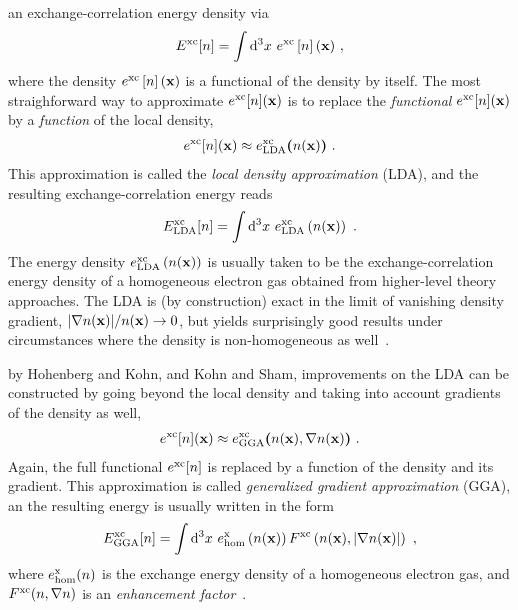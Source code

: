  an exchange-correlation energy density via
\begin{align}
	E^{\rm xc}[n] 
		= \int \d^3 x ~ e^{\rm xc} \left[ n \right] ({\bf x})~,
\label{eq:dft.xc.1}
\end{align}
where the density $e^{\rm xc} \left[ n \right] ({\bf x})$ is a functional of the density by itself. 
The most straighforward way to approximate $e^{\rm xc}[n] ({\bf x})$ is to replace the \emph{functional} $e^{\rm xc} [n] ({\bf x})$ by a \emph{function} of the local density,
\begin{align}
	e^{\rm xc} [n] ({\bf x})
		\approx e^{\rm xc}_{\rm LDA} \bm ( n({\bf x}) \bm )~.
	\label{eq:dft.exc.lda.1}
\end{align}
This approximation is called the \emph{local density approximation} (LDA), and the resulting exchange-correlation energy reads
\begin{align}
	E^{\rm xc}_{\rm LDA}[n] 
		= \int \d^3 x ~ e^{\rm xc}_{\rm LDA} \left(n ({\bf x}) \right)~.
	\label{eq:dft.LDA.1}
\end{align}
The energy density $e^{\rm xc}_{\rm LDA} \left(n ({\bf x}) \right)$ is usually taken to be the exchange-correlation energy density of a homogeneous electron gas obtained from higher-level theory approaches. The LDA is (by construction) exact in the limit of vanishing density gradient, $\lvert \nabla n ({\bf x}) \rvert / n({\bf x}) \rightarrow 0$, but yields surprisingly good results under circumstances where the density is non-homogeneous as well~\cite[p.\,183]{Dreizler2012}.

 by Hohenberg and Kohn, and Kohn and Sham, improvements on the LDA can be constructed by going beyond the local density and taking into account gradients of the density as well,
\begin{align}
	e^{\rm xc} [n] ({\bf x})
		\approx e^{\rm xc}_{\rm GGA} \bm ( n({\bf x}), \nabla n({\bf x}) \bm )~.
	\label{eq:dft.exc.gga.1}
\end{align}
Again, the full functional $e^{\rm xc}[n]$ is replaced by a function of the density and its gradient. This approximation is called \emph{generalized gradient approximation} (GGA), an the resulting energy is usually written in the form
\begin{align}
		E^{\rm xc}_{\rm GGA}[n] 
		= \int \d^3 x ~ e^{\rm x}_{\rm hom} \left(n ({\bf x}) \right) 
			F^{\rm xc} \left(n ({\bf x}), \lvert \nabla n ({\bf x})\rvert \right)~,
		\label{eq:dft.GGA.1}
\end{align}
where $e^{\rm x}_{\rm hom}(n)$ is the exchange energy density of a homogeneous electron gas, and $F^{\rm xc}(n, \nabla n)$ is an \emph{enhancement factor}~\cite{Perdew1992}.

